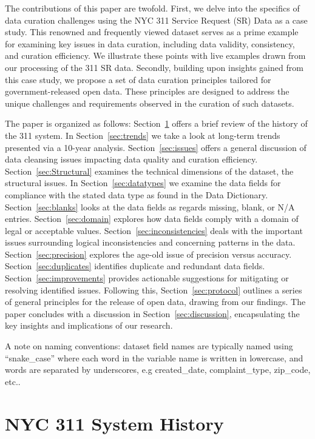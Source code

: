 \documentclass[12pt, titlepage]{article}
\begin{document}
The contributions of this paper are twofold. First, we delve into
the specifics of data curation challenges using the NYC 311 Service
Request (SR) Data as a case study. This renowned and frequently viewed 
dataset serves as a prime example for examining key issues in data curation, 
including data validity, consistency, and curation efficiency. 
We illustrate these points with live examples drawn from our processing of the 311 SR data. 
Secondly, building upon insights gained from this case study, we 
propose a set of data curation principles tailored for government-released open data. 
These principles are designed to address the unique challenges 
and requirements observed in the curation of such datasets.


The paper is organized as follows:
Section~\ref{sec:history} offers a brief review of the history of the 311 system. In 
Section~\ref{sec:trends} we take a look at long-term trends presented via a 10-year analysis.
Section~\ref{sec:issues} offers a general discussion of data cleansing issues
impacting data quality and curation efficiency. Section~\ref{sec:Structural} examines
the technical dimensions of the dataset, the structural issues. In Section~\ref{sec:datatypes} we examine the data fields
for compliance with the stated data type as found in the Data Dictionary. Section~\ref{sec:blanks} looks
at the data fields as regards missing, blank, or N/A entries. Section~\ref{sec:domain} explores
how data fields comply with a domain of legal or acceptable values. Section~\ref{sec:inconsistencies}
deals with the important issues surrounding logical inconsistencies and concerning patterns in the data. Section~\ref{sec:precision} 
explores the age-old issue of precision versus accuracy. Section~\ref{sec:duplicates}
identifies duplicate and redundant data fields. Section~\ref{sec:improvements} provides 
actionable suggestions for mitigating or resolving identified issues. Following this, Section~\ref{sec:protocol} outlines a series of general 
principles for the release of open data, drawing from our findings. The paper concludes with a discussion 
in Section~\ref{sec:discussion}, encapsulating the key insights and implications of our research.

A note on naming conventions: dataset field names are typically named using ``snake\_case'' where
each word in the variable name is written in lowercase, and words are separated by underscores,
e.g created\_date, complaint\_type, zip\_code, etc..   



\section{NYC 311 System History} \label{sec:history}
\end{document}
